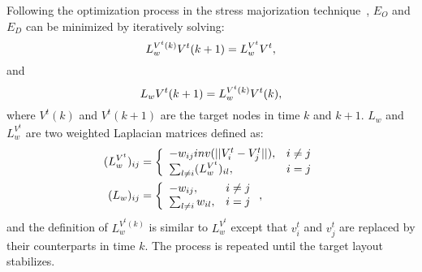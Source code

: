  Following the optimization process in the stress majorization technique~\cite{DBLP:conf/gd/GansnerKN04}, $E_O$ and $E_D$ can be minimized by iteratively solving:
\begin{equation}
    \setlength{\abovedisplayskip}{5pt}
    \setlength{\abovedisplayshortskip}{5pt}
    \setlength{\belowdisplayshortskip}{5pt}
    \setlength{\belowdisplayskip}{5pt}
    L_{w}^{V^t(k)} V^t(k+1) = L_{w}^{V^t} V^t,
\end{equation}
and 
\begin{equation}
    \setlength{\abovedisplayskip}{5pt}
    \setlength{\abovedisplayshortskip}{5pt}
    \setlength{\belowdisplayshortskip}{5pt}
    \setlength{\belowdisplayskip}{5pt}
    L_{w} V^t(k+1) = L_{w}^{V^t(k)} V^t(k),
\end{equation}
where $V^{t}(k)$ and $V^{t}(k+1)$ are the target nodes in time $k$ and $k + 1$. $L_w$ and $L_{w}^{V^t}$ are two weighted Laplacian matrices defined as:
\begin{equation}
    \setlength{\abovedisplayskip}{5pt}
    \setlength{\abovedisplayshortskip}{5pt}
    \setlength{\belowdisplayshortskip}{5pt}
    \setlength{\belowdisplayskip}{5pt}
    \begin{aligned}
        (L_{w}^{V^t})_{i j} &= \left\{\begin{array}{ll}
            - w_{i j} inv(||V^t_i - V^t_j||), & i \neq j \\
            \sum_{l \neq i} (L_{w}^{V^t})_{i l}, & i = j \\
        \end{array}\right. \\
        (L_{w})_{i j} &= \left\{\begin{array}{ll}
            - w_{i j}, & i \neq j \\
            \sum_{l \neq i} w_{i l}, & i = j \\
        \end{array}\right.,
    \end{aligned}
\end{equation}
and the definition of $L_{w}^{V^t(k)}$ is similar to $L_{w}^{V^t}$ except that $v^t_i$ and $v^t_j$ are replaced by their counterparts in time $k$. The process is repeated until the target layout stabilizes.


